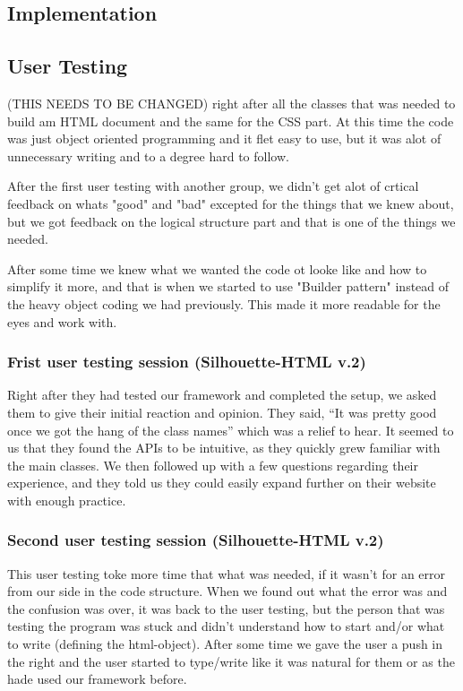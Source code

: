 \documentclass[12pt]{article}
\begin{document}
    \subsection{Implementation}


    \subsection{User Testing}


    (THIS NEEDS TO BE CHANGED)
    right after all the classes that was needed to build am HTML document and the same for the CSS part. At this time the code was just object oriented programming and it flet easy to use, but it was alot of unnecessary writing and to a degree hard to follow.   
        
    After the first user testing with another group, we didn't get alot of crtical feedback on whats "good" and "bad" excepted for the things that we knew about, but we got feedback on the logical structure part and that is one of the things we needed.
        
    After some time we knew what we wanted the code ot looke like and how to simplify it more, and that is when we started to use "Builder pattern" instead of the heavy object coding we had previously. This made it more readable for the eyes and work with.

        \subsubsection{Frist user testing session (Silhouette-HTML v.2)}
        Right after they had tested our framework and completed the setup, we asked them to give their initial reaction and opinion. They said, “It was pretty good once we got the hang of the class names” which was a relief to hear. It seemed to us that they found the APIs to be intuitive, as they quickly grew familiar with the main classes. We then followed up with a few questions regarding their experience, and they told us they could easily expand further on their website with enough practice.

        \subsubsection{Second user testing session (Silhouette-HTML v.2)}
        This user testing toke more time that what was needed, if it wasn’t for an error from our side in the code structure. When we found out what the error was and the confusion was over, it was back to the user testing, but the person that was testing the program was stuck and didn’t understand how to start and/or what to write (defining the html-object). After some time we gave the user a push in the right and the user started to type/write like it was natural for them or as the hade used our framework before.
\end{document}

